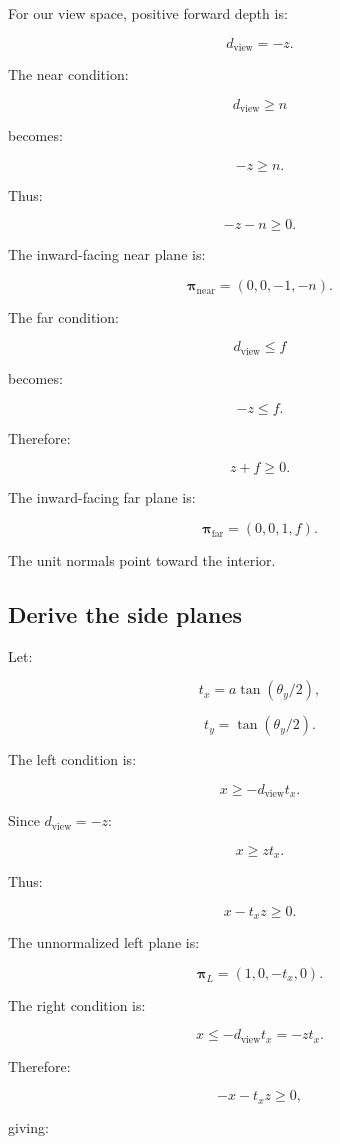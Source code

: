 For our view space, positive forward depth is:

\[
 d_{\mathrm{view}}=-z.
\]

The near condition:

\[
 d_{\mathrm{view}}\ge n
\]

becomes:

\[
 -z\ge n.
\]

Thus:

\[
 \boxed{ -z-n\ge0 }.
\]

The inward-facing near plane is:

\[
 \boxed{ \boldsymbol\pi_{\mathrm{near}}=(0,0,-1,-n) }.
\]

The far condition:

\[
 d_{\mathrm{view}}\le f
\]

becomes:

\[
 -z\le f.
\]

Therefore:

\[
 \boxed{ z+f\ge0 }.
\]

The inward-facing far plane is:

\[
 \boxed{ \boldsymbol\pi_{\mathrm{far}}=(0,0,1,f) }.
\]

The unit normals point toward the interior.

\subsection{Derive the side planes}\label{02-foundations-ii-ch034-derive-the-side-planes}

Let:

\[
 t_x=a\tan(\theta_y/2),
\]

\[
 t_y=\tan(\theta_y/2).
\]

The left condition is:

\[
 x\ge-d_{\mathrm{view}}t_x.
\]

Since \(d_{\mathrm{view}}=-z\):

\[
 x\ge zt_x.
\]

Thus:

\[
 \boxed{x-t_xz\ge0}.
\]

The unnormalized left plane is:

\[
 \boxed{ \boldsymbol\pi_L=(1,0,-t_x,0) }.
\]

The right condition is:

\[
 x\le-d_{\mathrm{view}}t_x=-zt_x.
\]

Therefore:

\[
 \boxed{-x-t_xz\ge0},
\]

giving:

